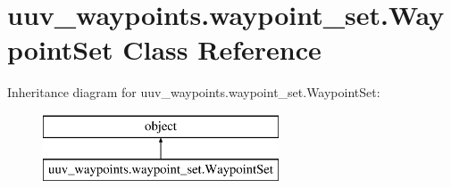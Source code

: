 \hypertarget{classuuv__waypoints_1_1waypoint__set_1_1WaypointSet}{}\section{uuv\+\_\+waypoints.\+waypoint\+\_\+set.\+Waypoint\+Set Class Reference}
\label{classuuv__waypoints_1_1waypoint__set_1_1WaypointSet}
Inheritance diagram for uuv\+\_\+waypoints.\+waypoint\+\_\+set.\+Waypoint\+Set\+:\begin{figure}[H]
\begin{center}
\leavevmode
\includegraphics[height=2.000000cm]{classuuv__waypoints_1_1waypoint__set_1_1WaypointSet}
\end{center}
\end{figure}
